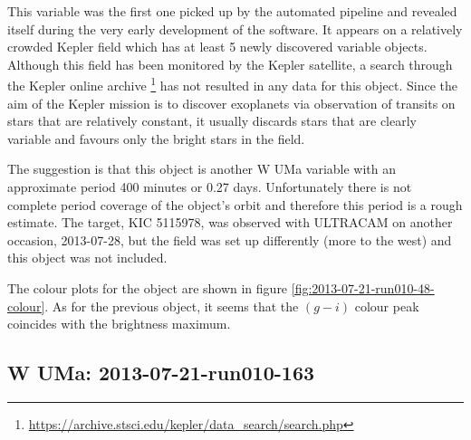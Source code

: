  
This variable was the first one picked up by the automated pipeline and revealed itself during the very early development of the software. It appears on a relatively crowded Kepler field which has at least 5 newly discovered variable objects. Although this field has been monitored by the Kepler satellite, a search through the Kepler online archive \footnote{\url{https://archive.stsci.edu/kepler/data_search/search.php}} has not resulted in any data for this object. Since the aim of the Kepler mission is to discover exoplanets via observation of transits on stars that are relatively constant, it usually discards stars that are clearly variable and favours only the bright stars in the field. 

The suggestion is that this object is another {W UMa} variable with an approximate period 400 minutes or 0.27 days. Unfortunately there is not complete period coverage of the object's orbit and therefore this period is a rough estimate. The target, KIC 5115978, was observed with ULTRACAM on another occasion, 2013-07-28, but the field was set up differently (more to the west) and this object was not included. 

The colour plots for the object are shown in figure \ref{fig:2013-07-21-run010-48-colour}. As for the previous object, it seems that the $(g-i)$ colour peak coincides with the brightness maximum.

\subsection{{W UMa}: 2013-07-21-run010-163}

